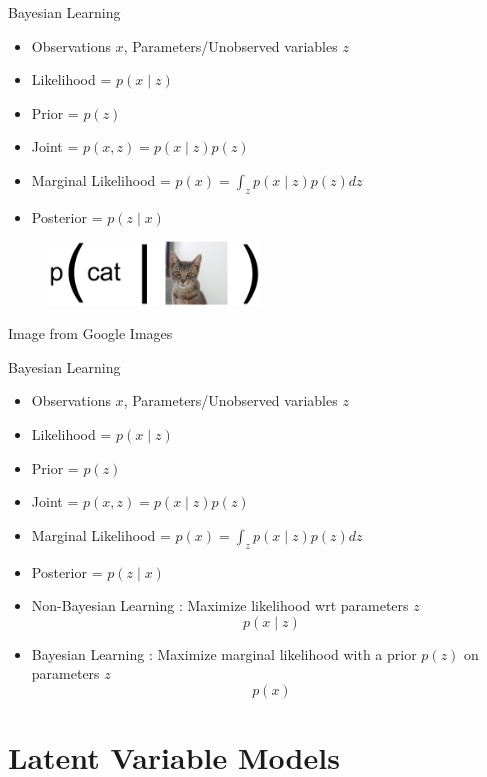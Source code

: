 \documentclass{beamer}
\begin{document}
\begin{frame}{Bayesian Learning}{}
    \begin{itemize}
        \item Observations $x$, Parameters/Unobserved variables $z$
        \item Likelihood = $p ( x \mid z )$
        \item Prior = $p ( z )$
        \item Joint = $p(x, z) = p(x \mid z) p(z)$
        \item Marginal Likelihood = $p(x) = \int_{z} p(x \mid z) p(z) dz$
        \item Posterior = $p(z \mid x) $
    \end{itemize}

    \begin{figure}
        \centering
        \includegraphics[width=0.5\textwidth]{bayes5}
    \end{figure}
    {\small Image from Google Images}
\end{frame}


\begin{frame}{Bayesian Learning}{}
    \begin{itemize}
        \item Observations $x$, Parameters/Unobserved variables $z$
        \item Likelihood = $p ( x \mid z )$
        \item Prior = $p ( z )$
        \item Joint = $p(x, z) = p(x \mid z) p(z)$
        \item Marginal Likelihood = $p(x) = \int_{z} p(x \mid z) p(z) dz$
        \item Posterior = $p(z \mid x) $
        \item {
            Non-Bayesian Learning : Maximize likelihood wrt parameters $z$ $$p ( x \mid z )$$
        }
        \item {
            Bayesian Learning : Maximize marginal likelihood with a prior $p(z)$ on parameters $z$ $$p(x)$$
        }
    \end{itemize}
\end{frame}


\section{Latent Variable Models}
\end{document}
